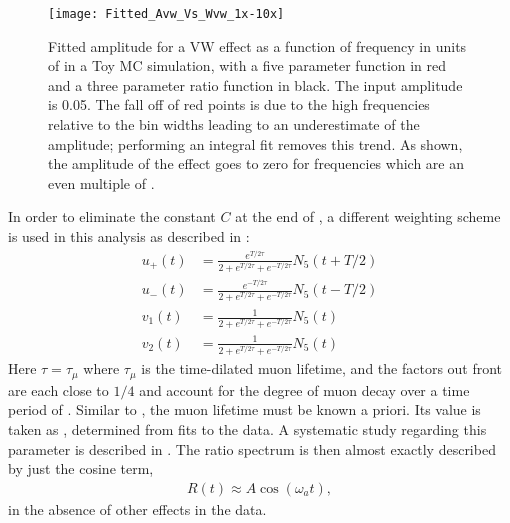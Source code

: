     \begin{figure}[ht]
        \centering
        \texttt{[image: Fitted\_Avw\_Vs\_Wvw\_1x-10x]}
        \caption[Cancellation of effect in Ratio Method versus frequency]{Fitted amplitude for a VW effect as a function of frequency in units of \wa in a Toy MC simulation, with a five parameter function in red and a three parameter ratio function in black. The input amplitude is 0.05. The fall off of red points is due to the high frequencies relative to the bin widths leading to an underestimate of the amplitude; performing an integral fit removes this trend. As shown, the amplitude of the effect goes to zero for frequencies which are an even multiple of \wa.}
        \label{fig:CancellationInRatioMethod}
    \end{figure}



 In order to eliminate the constant $C$ at the end of , a different weighting scheme is used in this analysis as described in :
    \begin{equation}
    \begin{aligned}
        u_{+}(t) &= \frac{e^{T/2\tau}}{2 + e^{T/2\tau} + e^{-T/2\tau}} N_{5}(t+T/2) \\
        u_{-}(t) &= \frac{e^{-T/2\tau}}{2 + e^{T/2\tau} + e^{-T/2\tau}} N_{5}(t-T/2) \\
        v_{1}(t) &= \frac{1}{2 + e^{T/2\tau} + e^{-T/2\tau}} N_{5}(t) \\
        v_{2}(t) &= \frac{1}{2 + e^{T/2\tau} + e^{-T/2\tau}} N_{5}(t)
    \label{eqn:fourHistsInText}
    \end{aligned}
    \end{equation}
Here $\tau = \tau_{\mu}$ where $\tau_{\mu}$ is the time-dilated muon lifetime, and the factors out front are each close to $1/4$ and account for the degree of muon decay over a time period of \Tatwo. Similar to \Ta, the muon lifetime must be known a priori. Its value is taken as , determined from fits to the data. A systematic study regarding this parameter is described in . The ratio spectrum is then almost exactly described by just the cosine term,
    \begin{align} \label{eq:threeparamratio}
        R(t) \approx A \cos(\omega_{a}t),
    \end{align}
in the absence of other effects in the data. 




